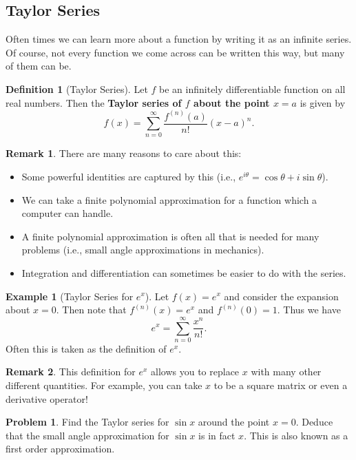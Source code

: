 \documentclass[12pt]{article}
\theoremstyle{definition}
\newtheorem{definition}{Definition}[section]
\newtheorem{example}{Example}[section]
\newtheorem{remark}{Remark}[section]
\newtheorem{problem}{Problem}[section]
\begin{document}
\subsection{Taylor Series}

Often times we can learn more about a function by writing it as an infinite series.  Of course, not every function we come across can be written this way, but many of them can be.  

\begin{definition}[Taylor Series]
Let $f$ be an infinitely differentiable function on all real numbers.  Then the \textbf{Taylor series of $f$ about the point $x=a$} is given by
\[
f(x)=\sum_{n=0}^\infty \frac{f^{(n)}(a)}{n!} (x-a)^n.
\]
\end{definition}

\begin{remark}
There are many reasons to care about this:
\begin{itemize}
    \item Some powerful identities are captured by this (i.e., $e^{i\theta}=\cos \theta + i \sin \theta$).
    \item We can take a finite polynomial approximation for a function which a computer can handle.
    \item A finite polynomial approximation is often all that is needed for many problems (i.e., small angle approximations in mechanics).
    \item Integration and differentiation can sometimes be easier to do with the series.
\end{itemize}
\end{remark}

\begin{example}[Taylor Series for $e^x$]
Let $f(x)=e^x$ and consider the expansion about $x=0$.  Then note that $f^{(n)}(x)=e^x$ and $f^{(n)}(0)=1$.  Thus we have
\[
e^x = \sum_{n=0}^\infty \frac{x^n}{n!}.
\]
Often this is taken as the definition of $e^x$.
\end{example}

\begin{remark}
This definition for $e^x$ allows you to replace $x$ with many other different quantities. For example, you can take $x$ to be a square matrix or even a derivative operator!
\end{remark}

\begin{problem}
Find the Taylor series for $\sin x$ around the point $x=0$.  Deduce that the small angle approximation for $\sin x$ is in fact $x$. This is also known as a first order approximation. 
\end{problem}
\end{document}
